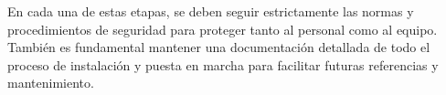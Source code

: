 En cada una de estas etapas, se deben seguir estrictamente las normas y procedimientos de seguridad para proteger tanto al personal como al equipo. También es fundamental mantener una documentación detallada de todo el proceso de instalación y puesta en marcha para facilitar futuras referencias y mantenimiento.
